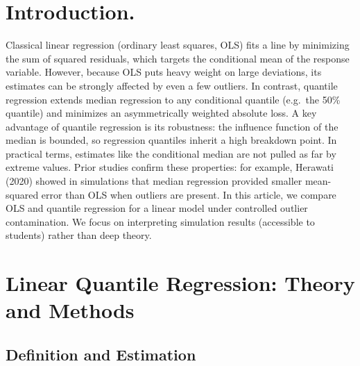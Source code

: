 \documentclass[fleqn,8pt]{latex/stylish_article} %
\affiliation{

}
\affiliation{*\textbf{Corresponding author}: , \url{https://www.uc3m.es}} %
\begin{document}

\flushbottom %

\maketitle %

\tableofcontents %

\thispagestyle{empty} %


\section{Introduction.}\label{introduction.}

Classical linear regression (ordinary least squares, OLS) fits a line by minimizing the sum of squared residuals, which targets the conditional mean of the response variable. However, because OLS puts heavy weight on large deviations, its estimates can be strongly affected by even a few outliers. In contrast, quantile regression extends median regression to any conditional quantile (e.g.~the 50\% quantile) and minimizes an asymmetrically weighted absolute loss. A key advantage of quantile regression is its robustness: the influence function of the median is bounded, so regression quantiles inherit a high breakdown point. In practical terms, estimates like the conditional median are not pulled as far by extreme values. Prior studies confirm these properties: for example, Herawati (2020) showed in simulations that median regression provided smaller mean-squared error than OLS when outliers are present. In this article, we compare OLS and quantile regression for a linear model under controlled outlier contamination. We focus on interpreting simulation results (accessible to students) rather than deep theory.

\section{Linear Quantile Regression: Theory and Methods}\label{linear-quantile-regression-theory-and-methods}

\subsection{Definition and Estimation}\label{definition-and-estimation}
\end{document}
